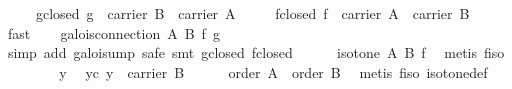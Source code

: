 \begin{isabellebody}
\ \ \ \ \ g{}closed{}\ {}g\ {}\ carrier\ B\ {}\ carrier\ A{}\isanewline
\ \ \ \ \ f{}closed{}\ {}f\ {}\ carrier\ A\ {}\ carrier\ B{}\isanewline
\ \ \ \ \isamarkupfalse%
\ fast{}\isanewline
\ \ \isamarkupfalse%
\ {}galois{}connection\ A\ B\ f\ g{}\isanewline
\ \ \isamarkupfalse%
\ {}simp\ add{}\ galois{}ump{}{}\ safe{}\ {}smt\ g{}closed\ f{}closed{}{}{}\isanewline
\ \ \ \ \isamarkupfalse%
\ {}isotone\ A\ B\ f{}\ \isamarkupfalse%
\ {}metis\ f{}iso{}\isanewline
\ \ \isamarkupfalse%
\isanewline
\ \ \ \ \isamarkupfalse%
\ y\ \isamarkupfalse%
\ yc{}\ {}y\ {}\ carrier\ B{}\isanewline
\ \ \ \ \isamarkupfalse%
\ {}order\ A{}\ \ {}order\ B{}\ \isamarkupfalse%
\ {}metis\ f{}iso\ isotone{}def{}{}\isanewline
\ \ \ \ \isamarkupfalse%

\end{isabellebody}
